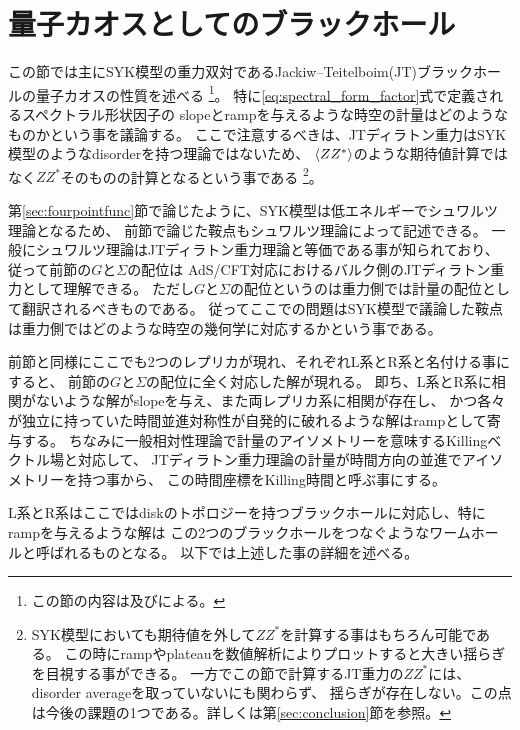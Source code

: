 \section{量子カオスとしてのブラックホール\label{sec:gravity}}
この節では主にSYK模型の重力双対であるJackiw--Teitelboim(JT)ブラックホールの量子カオスの性質を述べる
\footnote{この節の内容は\cite{polchinski_chaos}及び\cite{stanford_chaos}による。}。
特に\eqref{eq:spectral_form_factor}式で定義されるスペクトラル形状因子の
slopeとrampを与えるような時空の計量はどのようなものかという事を議論する。
ここで注意するべきは、JTディラトン重力はSYK模型のようなdisorderを持つ理論ではないため、
$\langle ZZ^* \rangle$のような期待値計算ではなく$ZZ^*$そのものの計算となるという事である
\footnote{SYK模型においても期待値を外して$ZZ^*$を計算する事はもちろん可能である。
この時にrampやplateauを数値解析によりプロットすると大きい揺らぎを目視する事ができる。
一方でこの節で計算するJT重力の$ZZ^*$には、disorder averageを取っていないにも関わらず、
揺らぎが存在しない。この点は今後の課題の1つである。詳しくは第\ref{sec:conclusion}節を参照。}。

第\ref{sec:fourpointfunc}節で論じたように、SYK模型は低エネルギーでシュワルツ理論となるため、
前節で論じた鞍点もシュワルツ理論によって記述できる。
一般にシュワルツ理論はJTディラトン重力理論と等価である事が知られており、従って前節の$G$と$\Sigma$の配位は
AdS/CFT対応におけるバルク側のJTディラトン重力として理解できる。
ただし$G$と$\Sigma$の配位というのは重力側では計量の配位として翻訳されるべきものである。
従ってここでの問題はSYK模型で議論した鞍点は重力側ではどのような時空の幾何学に対応するかという事である。

前節と同様にここでも2つのレプリカが現れ、それぞれL系とR系と名付ける事にすると、
前節の$G$と$\Sigma$の配位に全く対応した解が現れる。
即ち、L系とR系に相関がないような解がslopeを与え、また両レプリカ系に相関が存在し、
かつ各々が独立に持っていた時間並進対称性が自発的に破れるような解はrampとして寄与する。
ちなみに一般相対性理論で計量のアイソメトリーを意味するKillingベクトル場と対応して、
JTディラトン重力理論の計量が時間方向の並進でアイソメトリーを持つ事から、
この時間座標をKilling時間と呼ぶ事にする。

L系とR系はここではdiskのトポロジーを持つブラックホールに対応し、特にrampを与えるような解は
この2つのブラックホールをつなぐようなワームホールと呼ばれるものとなる。
以下では上述した事の詳細を述べる。

